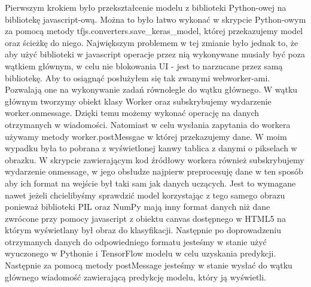 \documentclass{article}
\begin{document}
Pierwszym krokiem było przekształcenie modelu z biblioteki Python-owej na bibliotekę javascript-ową.
Można to było łatwo wykonać w skrypcie Python-owym za pomocą metody tfjs.converters.save\_keras\_model, której przekazujemy model oraz ścieżkę do niego.
Największym problemem w tej zmianie było jednak to, że aby użyć biblioteki w javascript operacje przez nią wykonywane musiały być poza wątkiem głównym, w celu nie blokowania UI - jest to narzucane przez samą bibliotekę.
Aby to osiągnąć posłużyłem się tak zwanymi webworker-ami.
Pozwalają one na wykonywanie zadań równolegle do wątku głównego.
W wątku głównym tworzymy obiekt klasy Worker oraz subskrybujemy wydarzenie worker.onmessage.
Dzięki temu możemy wykonać operację na danych otrzymanych w wiadomości. Natomiast w celu wysłania zapytania do workera używamy metody worker.postMessgae w której przekazujemy dane.
W moim wypadku była to pobrana z wyświetlonej kanwy tablica z danymi o pikselach w obrazku.
W skrypcie zawierającym kod źródłowy workera również subskrybujemy wydarzenie onmessage, w jego obsłudze najpierw preprocesuję dane w ten sposób aby ich format na wejście był taki sam jak danych uczących.
Jest to wymagane nawet jeżeli chcielibyśmy sprawdzić model korzystając z tego samego obrazu ponieważ biblioteki PIL oraz NumPy mają inny format danych niż dane zwrócone przy pomocy javascript z obiektu canvas dostępnego w HTML5 na którym wyświetlany był obraz do klasyfikacji.
Następnie po doprowadzeniu otrzymanych danych do odpowiedniego formatu jesteśmy w stanie użyć wyuczonego w Pythonie i TensorFlow modelu w celu uzyskania predykcji.
Następnie za pomocą metody postMessage jesteśmy w stanie wysłać do wątku głównego wiadomość zawierającą predykcję modelu, który ją wyświetli.
\end{document}
